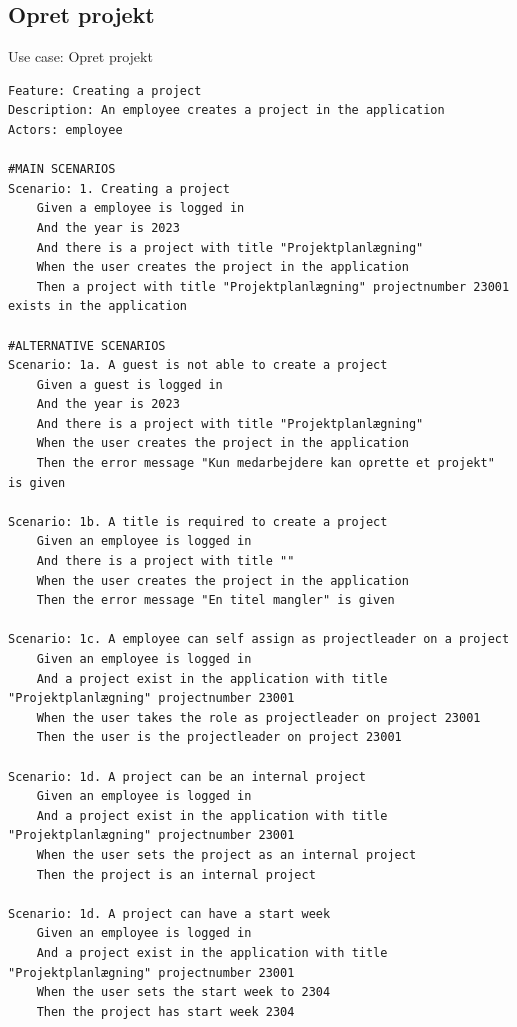\subsection{Opret projekt} 
\begin{listing}[H]
    \centering
    \caption{Use case: Opret projekt}\label{lst:usecase_create_project}
    \begin{verbatim}  
Feature: Creating a project
Description: An employee creates a project in the application
Actors: employee

#MAIN SCENARIOS
Scenario: 1. Creating a project
    Given a employee is logged in
    And the year is 2023
    And there is a project with title "Projektplanlægning" 
    When the user creates the project in the application 
    Then a project with title "Projektplanlægning" projectnumber 23001 exists in the application

#ALTERNATIVE SCENARIOS
Scenario: 1a. A guest is not able to create a project
    Given a guest is logged in
    And the year is 2023
    And there is a project with title "Projektplanlægning"  
    When the user creates the project in the application 
    Then the error message "Kun medarbejdere kan oprette et projekt" is given

Scenario: 1b. A title is required to create a project
    Given an employee is logged in
    And there is a project with title ""  
    When the user creates the project in the application 
    Then the error message "En titel mangler" is given

Scenario: 1c. A employee can self assign as projectleader on a project
    Given an employee is logged in
    And a project exist in the application with title "Projektplanlægning" projectnumber 23001
    When the user takes the role as projectleader on project 23001
    Then the user is the projectleader on project 23001

Scenario: 1d. A project can be an internal project
    Given an employee is logged in
    And a project exist in the application with title "Projektplanlægning" projectnumber 23001
    When the user sets the project as an internal project
    Then the project is an internal project

Scenario: 1d. A project can have a start week
    Given an employee is logged in
    And a project exist in the application with title "Projektplanlægning" projectnumber 23001
    When the user sets the start week to 2304
    Then the project has start week 2304
    
    \end{verbatim}
\end{listing}


